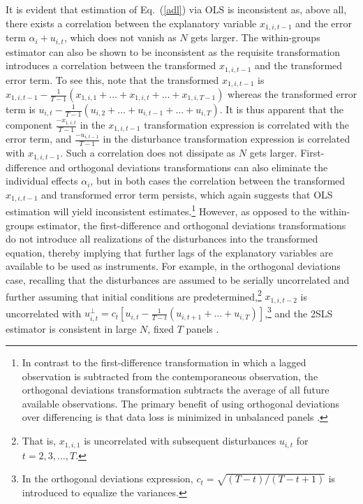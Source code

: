 \documentclass[english]{article}
\begin{document}
It is evident that estimation of Eq.\ (\ref{adl}) via OLS is inconsistent as, above all, there exists a correlation between the explanatory variable $x_{1,i,t-1}$ and the error term $\alpha_i + u_{i,t}$, which does not vanish as $N$ gets larger. The within-groups estimator can also be shown to be inconsistent as the requisite transformation introduces a correlation between the transformed $x_{1,i,t-1}$ and the transformed error term. To see this, note that the transformed $x_{1,i,t-1}$ is $x_{1,i,t-1} - \frac{1}{T-1} (x_{1,i,1} + \ldots + x_{1,i,t} + \ldots + x_{1,i,T-1})$ whereas the transformed error term is $u_{i,t} - \frac{1}{T-1} (u_{i,2} + \ldots + u_{i,t-1} + \ldots + u_{i,T})$. It is thus apparent that the component $\frac{-x_{1,i,t}}{T-1}$ in the $x_{1,i,t-1}$ transformation expression is correlated with the error term, and $\frac{-u_{i,t-1}}{T-1}$ in the disturbance transformation expression is correlated with $x_{1,i,t-1}$. Such a correlation does not dissipate as $N$ gets larger. First-difference and orthogonal deviations transformations can also eliminate the individual effects $\alpha_i$, but in both cases the correlation between the transformed $x_{1,i,t-1}$ and transformed error term persists, which again suggests that OLS estimation will yield inconsistent estimates.\footnote{In contrast to the first-difference transformation in which a lagged observation is subtracted from the contemporaneous observation, the orthogonal deviations transformation subtracts the average of all future available observations. The primary benefit of using orthogonal deviations over differencing is that data loss is minimized in unbalanced panels \citep{arellano1995}.} However, as opposed to the within-groups estimator, the first-difference and orthogonal deviations transformations do not introduce all realizations of the disturbances into the transformed equation, thereby implying that further lags of the explanatory variables are available to be used as instruments. For example, in the orthogonal deviations case, recalling that the disturbances are assumed to be serially uncorrelated and further assuming that initial conditions are predetermined,\footnote{That is, $x_{1,i,1}$ is uncorrelated with subsequent disturbances $u_{i,t}$ for $t=2,3,\ldots,T$.} $x_{1,i,t-2}$ is uncorrelated with $u_{i,t}^{\perp} = c_t\left[u_{i,t} - \frac{1}{T - t }\left(u_{i,t + 1} + \ldots + u_{i,T} \right) \right]$,\footnote{In the orthogonal deviations expression, $c_t = \sqrt{(T - t)/(T - t + 1)}$ is introduced to equalize the variances.} and the 2SLS estimator is consistent in large $N$, fixed $T$ panels \citep{anderson1982, arellano1995, bond2002, roodman2009}.
\end{document}
